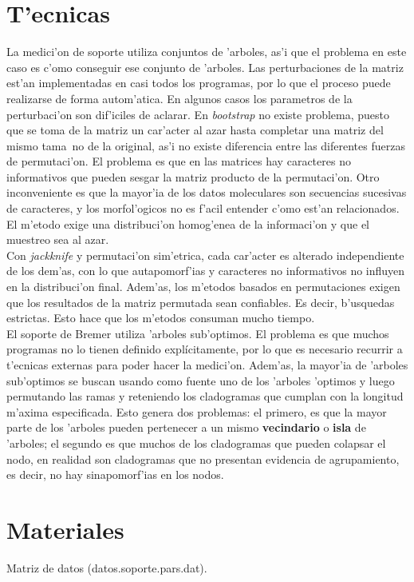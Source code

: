 \section{T'ecnicas}
La medici'on de soporte utiliza conjuntos de 'arboles, as'i que el problema en este caso es c'omo conseguir ese conjunto de 'arboles. Las perturbaciones de la matriz est'an implementadas en casi todos los programas, por lo que el proceso puede realizarse de forma autom'atica. En algunos casos los parametros de la perturbaci'on son dif'iciles de aclarar. En \textit{bootstrap} no existe problema, puesto que se toma de la matriz un car'acter al azar hasta completar una matriz del mismo tama~no de la original, as'i no existe diferencia entre las diferentes fuerzas de permutaci'on. El problema es que en las matrices hay caracteres no informativos que pueden sesgar la matriz producto de la permutaci'on. Otro inconveniente es que la mayor'ia de los datos moleculares son secuencias sucesivas de caracteres, y los morfol'ogicos no es f'acil entender c'omo est'an relacionados. El m'etodo exige una distribuci'on homog'enea de la informaci'on y que el muestreo sea al azar.\\
Con \textit{jackknife} y permutaci'on sim'etrica, cada car'acter es alterado independiente de los dem'as, con lo que autapomorf'ias y caracteres no informativos no influyen en la distribuci'on final. Adem'as, los m'etodos basados en permutaciones exigen que los resultados de la matriz permutada sean confiables. Es decir, b'usquedas estrictas. Esto hace que los m'etodos consuman mucho tiempo.\\
El soporte de Bremer utiliza 'arboles sub'optimos. El problema es que muchos programas no lo tienen definido expl\'icitamente, por lo que es necesario recurrir a t'ecnicas externas para poder hacer la medici'on. Adem'as, la mayor'ia de 'arboles sub'optimos se buscan usando como fuente uno de los 'arboles 'optimos y luego permutando las ramas y reteniendo los cladogramas que cumplan con la longitud m'axima especificada. Esto genera dos problemas: el primero, es que la mayor parte de los 'arboles pueden pertenecer a un mismo \textbf{vecindario} o \textbf{isla} de 'arboles; el segundo es que muchos de los cladogramas que pueden colapsar el nodo, en realidad son cladogramas que no presentan evidencia de agrupamiento, es decir, no hay sinapomorf'ias en los nodos.
\section{Materiales}
\noindent
Matriz de datos (datos.soporte.pars.dat).
